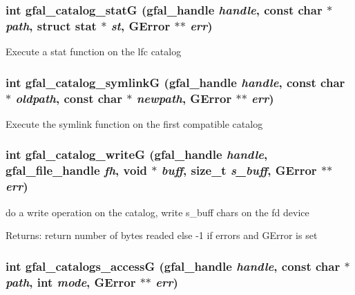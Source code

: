 \subsubsection{\setlength{\rightskip}{0pt plus 5cm}int gfal\_\-catalog\_\-stat\-G (gfal\_\-handle {\em handle}, const char $\ast$ {\em path}, struct stat $\ast$ {\em st}, GError $\ast$$\ast$ {\em err})}\label{gfal__common__catalog_8h_28ca68c00e4a67bc158975ef3e4f8013}


Execute a stat function on the lfc catalog 
\subsubsection{\setlength{\rightskip}{0pt plus 5cm}int gfal\_\-catalog\_\-symlink\-G (gfal\_\-handle {\em handle}, const char $\ast$ {\em oldpath}, const char $\ast$ {\em newpath}, GError $\ast$$\ast$ {\em err})}\label{gfal__common__catalog_8h_b4055bd8f8a33a10ef7a5814a0c1e1bf}


Execute the symlink function on the first compatible catalog 
\subsubsection{\setlength{\rightskip}{0pt plus 5cm}int gfal\_\-catalog\_\-write\-G (gfal\_\-handle {\em handle}, gfal\_\-file\_\-handle {\em fh}, void $\ast$ {\em buff}, size\_\-t {\em s\_\-buff}, GError $\ast$$\ast$ {\em err})}\label{gfal__common__catalog_8h_e9c3e214dbb01960295148aa66c42cb8}


do a write operation on the catalog, write s\_\-buff chars on the fd device \begin{Desc}
\item[Returns:]return number of bytes readed else -1 if errors and GError is set \end{Desc}
\subsubsection{\setlength{\rightskip}{0pt plus 5cm}int gfal\_\-catalogs\_\-access\-G (gfal\_\-handle {\em handle}, const char $\ast$ {\em path}, int {\em mode}, GError $\ast$$\ast$ {\em err})}\label{gfal__common__catalog_8h_4fd85b35f2134b73207c12b54e85959d}


